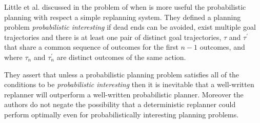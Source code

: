 Little et al. discussed in \cite{little2007probabilistic} the problem of when is more useful the probabilistic planning with respect a simple replanning system. 
They defined a planning problem \textit{probabilistic interesting} if dead ends can be avoided,
exist multiple goal trajectories and there is at least one pair of distinct goal trajectories, $\tau$ and $\tau^{'}$ that share a common sequence of outcomes for the first $n-1$ outcomes, and where $\tau_{n}$ and $\tau_{n}^{'}$ are distinct outcomes of the same action. 

They assert that unless a probabilistic planning problem satisfies all of the conditions to be \textit{probabilistic interesting} then it is inevitable that a well-written replanner will outperform a well-written probabilistic planner. Moreover the authors do not negate the possibility that a deterministic replanner could perform optimally even for probabilistically interesting planning problems. 


